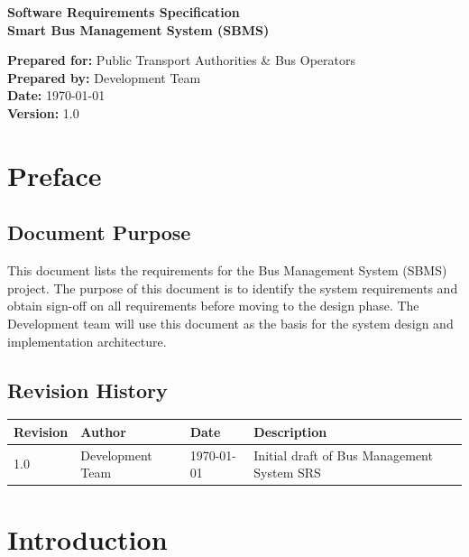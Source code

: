 \documentclass[11pt, a4paper]{article}
\begin{document}
\begin{titlepage}
    \centering
    \vspace*{2cm}
    {\Huge \textbf{Software Requirements Specification}}\\[0.5cm]
    {\Large \textbf{Smart Bus Management System (SBMS)}\\[2.0cm]}
    
    \vfill
    
    \textbf{Prepared for:} Public Transport Authorities \& Bus Operators\\
    \textbf{Prepared by:} Development Team\\
    \textbf{Date:} \today\\
    \textbf{Version:} 1.0
    \vspace*{1cm}
\end{titlepage}

\newpage
\tableofcontents
\newpage

\section{Preface}
\subsection{Document Purpose}
This document lists the requirements for the Bus Management System (SBMS) project. The purpose of this document is to identify the system requirements and obtain sign-off on all requirements before moving to the design phase. The Development team will use this document as the basis for the system design and implementation architecture.

\subsection{Revision History}
\begin{table}[h]
\centering
\begin{tabular}{llll}
\toprule
\textbf{Revision} & \textbf{Author} & \textbf{Date} & \textbf{Description} \\ \midrule
1.0 & Development Team & \today & Initial draft of Bus Management System SRS \\
\bottomrule
\end{tabular}
\end{table}

\section{Introduction}
\end{document}
